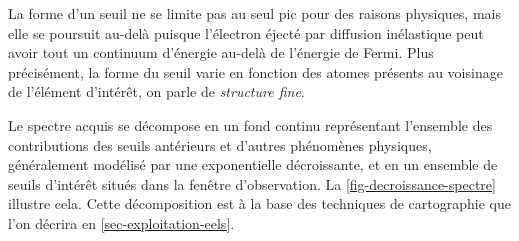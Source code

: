     La forme d'un seuil ne se limite pas au seul pic pour des raisons physiques, mais elle se poursuit au-delà puisque l'électron éjecté par diffusion inélastique peut avoir tout un continuum d'énergie au-delà de l'énergie de Fermi. Plus précisément, la forme du seuil varie en fonction des atomes présents au voisinage de l'élément d'intérêt, on parle de \emph{structure fine}.
    
    Le spectre acquis se décompose en un fond continu représentant l'ensemble des contributions des seuils antérieurs et d'autres phénomènes physiques, généralement modélisé par une exponentielle décroissante, et en un ensemble de seuils d'intérêt situés dans la fenêtre d'observation. La \cref{fig-decroissance-spectre} illustre cela. Cette décomposition est à la base des techniques de cartographie que l'on décrira en \cref{sec-exploitation-eels}.
    

